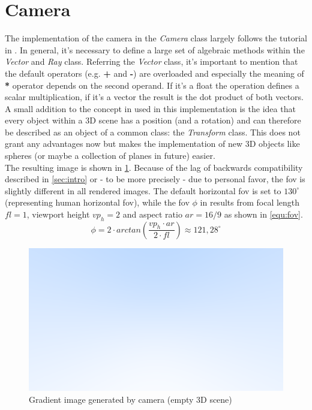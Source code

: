 \documentclass[]{article}
\begin{document}
	\section{Camera}
	The implementation of the camera in the \emph{Camera} class largely follows the tutorial in \cite{Shirley2020RTW1}. In general, it’s necessary to define a large set of algebraic methods within the \emph{Vector} and \emph{Ray} class. Referring the \emph{Vector} class, it’s important to mention that the default operators (e.g. \textbf{+} and \textbf{-}) are overloaded and especially the meaning of \textbf{*} operator depends on the second operand. If it’s a float the operation defines a scalar multiplication, if it’s a vector the result is the dot product of both vectors.
	\\
	A small addition to the concept in \cite{Shirley2020RTW1} used in this implementation is the idea that every object within a 3D scene has a position (and a rotation) and can therefore be described as an object of a common class: the \emph{Transform} class. This does not grant any advantages now but makes the implementation of new 3D objects like spheres (or maybe a collection of planes in future) easier.
	\\
	The resulting image is shown in \cref{fig:image2}. Because of the lag of backwards compatibility described in \cref{sec:intro} or - to be more precisely - due to personal favor, the \ac{fov} is slightly different in all rendered images. The default horizontal \ac{fov} is set to $130^{\circ}$ (representing human horizontal \ac{fov}), while the \ac{fov} $\phi$ in \cite{Shirley2020RTW1} results from focal length $fl=1$, viewport height $vp_h=2$ and aspect ratio $ar=\label{key}16/9$ as shown in \cref{equ:fov}.
	\begin{equation}
		\label{equ:fov}
		\phi = 2\cdot arctan\left(\frac{vp_h\cdot ar}{2\cdot fl}\right) \approx 121,28^{\circ}
	\end{equation}
	
	\begin{figure}[h]
		\centering
		\includegraphics[width=0.75\linewidth]{image2}
		\caption{Gradient image generated by camera (empty 3D scene)}
		\label{fig:image2}
	\end{figure}
\end{document}
